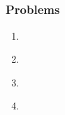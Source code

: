\subsection{ }
    \subsubsection*{Problems}
    \begin{enumerate}[label=\bfseries Problem \arabic*:,leftmargin=*,labelindent=1em]
    \addtocounter{enumi}{3}
        \item \\[0.2mm]
        \soln
        \item \\[0.2mm]
        \soln
        \item \\[0.2mm]
        \soln
        \item \\[0.2mm]
        \soln

\end{enumerate}

